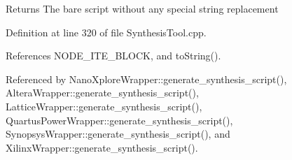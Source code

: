 \begin{DoxyReturn}{Returns}
The bare script without any special string replacement 
\end{DoxyReturn}


Definition at line 320 of file Synthesis\+Tool.\+cpp.



References N\+O\+D\+E\+\_\+\+I\+T\+E\+\_\+\+B\+L\+O\+CK, and to\+String().



Referenced by Nano\+Xplore\+Wrapper\+::generate\+\_\+synthesis\+\_\+script(), Altera\+Wrapper\+::generate\+\_\+synthesis\+\_\+script(), Lattice\+Wrapper\+::generate\+\_\+synthesis\+\_\+script(), Quartus\+Power\+Wrapper\+::generate\+\_\+synthesis\+\_\+script(), Synopsys\+Wrapper\+::generate\+\_\+synthesis\+\_\+script(), and Xilinx\+Wrapper\+::generate\+\_\+synthesis\+\_\+script().

